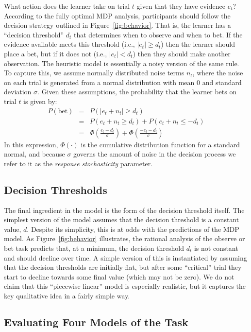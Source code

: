 \documentclass[authoryear]{elsarticle}
\newcommand{\subsectionX}[1]{\subsection{#1}}
\begin{document}
What action does the learner take on trial $t$ given that they have evidence $e_t$? According to the fully optimal MDP analysis, participants should follow the decision strategy outlined in Figure~\ref{fig:behavior}. That is, the learner has a ``decision threshold'' $d_t$ that determines when to observe and when to bet. If the evidence available meets this threshold (i.e., $|e_t| \geq d_t$) then the learner should place a bet, but if it does not (i.e., $|e_t| < d_t$) then they should make another observation. The heuristic model is essentially a noisy version of the same rule. To capture this, we assume normally distributed noise terms $n_t$, where the noise on each trial is generated from a normal distribution with mean 0 and standard deviation $\sigma$. Given these assumptions, the probability that the learner bets on trial $t$ is given by:
\begin{eqnarray}
P(\mbox{bet})
& = & P(|e_t + n_t| \geq d_t)  \nonumber \\
& = & P(e_t + n_t \geq d_t) + P(e_t + n_t \leq -d_t) \nonumber \\
& = & \Phi \left( \frac{e_t - d_t}{\sigma} \right) + \Phi \left( \frac{-e_t - d_t}{\sigma} \right)
\end{eqnarray}
In this expression, $\Phi(\cdot)$ is the cumulative distribution function for a standard normal, and because $\sigma$ governs the amount of noise in the decision process we refer to it as the {\it response stochasticity} parameter.

\subsectionX{Decision Thresholds}

The final ingredient in the model is the form of the decision threshold itself. The simplest version of the model assumes that the decision threshold is a constant value, $d$. Despite its simplicity, this is at odds with the predictions of the MDP model. As Figure~\ref{fig:behavior} illustrates, the rational analysis of the observe or bet task predicts that, at a minimum, the decision threshold $d_t$ is not constant and should decline over time. A simple version of this is instantiated by assuming that the decision thresholds are initially flat, but after some ``critical'' trial they start to decline towards some final value (which may not be zero). We do not claim that this ``piecewise linear'' model is especially realistic, but it captures the key qualitative idea in a fairly simple way.


\subsectionX{Evaluating Four Models of the Task}
\end{document}
